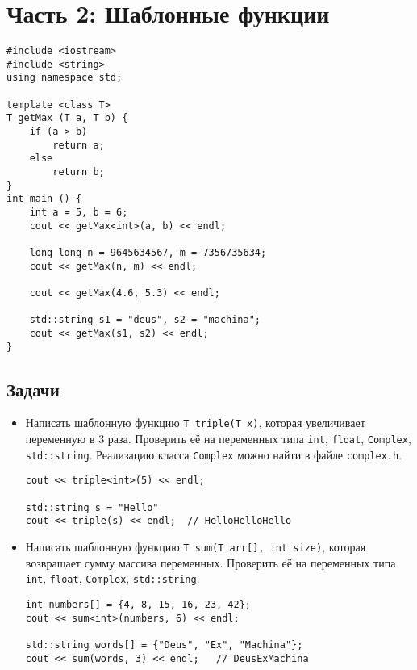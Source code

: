 \documentclass{article}
\begin{document}
\newpage
\section*{Часть 2: Шаблонные функции}

\begin{lstlisting}
#include <iostream>
#include <string>
using namespace std;

template <class T>
T getMax (T a, T b) {
    if (a > b)
    	return a;
    else 
    	return b;
}
int main () {
    int a = 5, b = 6;
    cout << getMax<int>(a, b) << endl;
    
    long long n = 9645634567, m = 7356735634;
    cout << getMax(n, m) << endl;
    
    cout << getMax(4.6, 5.3) << endl;
    
    std::string s1 = "deus", s2 = "machina";
    cout << getMax(s1, s2) << endl;
}
\end{lstlisting}

\subsection*{Задачи}
\begin{itemize}
\item Написать шаблонную функцию \texttt{T triple(T x)}, которая увеличивает переменную в 3 раза. Проверить её на переменных типа \texttt{int}, \texttt{float}, \texttt{Complex}, \texttt{std::string}. Реализацию класса \texttt{Complex} можно найти в файле \texttt{complex.h}.
\begin{lstlisting}
cout << triple<int>(5) << endl;
    
std::string s = "Hello"
cout << triple(s) << endl;  // HelloHelloHello
\end{lstlisting}
\item Написать шаблонную функцию \texttt{T sum(T arr[], int size)}, которая возвращает сумму массива переменных. Проверить её на переменных типа \texttt{int}, \texttt{float}, \texttt{Complex}, \texttt{std::string}.
\begin{lstlisting}
int numbers[] = {4, 8, 15, 16, 23, 42};
cout << sum<int>(numbers, 6) << endl;
    
std::string words[] = {"Deus", "Ex", "Machina"};
cout << sum(words, 3) << endl;   // DeusExMachina
\end{lstlisting}
\end{itemize}

\newpage
\end{document}
